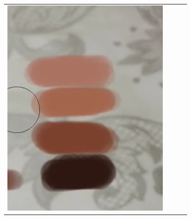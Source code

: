 \documentclass[12pt, a4paper]{article}
\begin{document}
\begin{longtable}{|c||c|c|c|}
\begin{minipage}{.29\textwidth}
    \includegraphics[width=\textwidth,height=\textheight,keepaspectratio]{images/match_body_targ}
  \end{minipage} & 
  \begin{minipage}{.29\textwidth}

\end{minipage}
\end{longtable}
\end{document}
